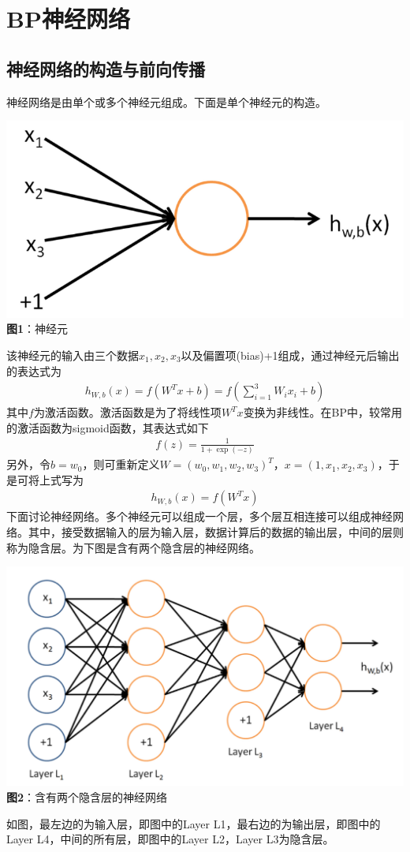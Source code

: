 \section{BP神经网络}
\subsection{神经网络的构造与前向传播}
神经网络是由单个或多个神经元组成。下面是单个神经元的构造。
\begin{center}
\includegraphics[scale=0.5]{../figures/NN1.png}\\
\textbf{图1}：神经元 
\end{center}
该神经元的输入由三个数据$x_1,x_2,x_3$以及偏置项(bias)+1组成，通过神经元后输出的表达式为
\begin{eqnarray}
h_{W,b}(x)=f(W^Tx+b)=f(\sum_{i=1}^3 W_ix_i+b)
\end{eqnarray}
其中$f$为激活函数。激活函数是为了将线性项$W^Tx$变换为非线性。在BP中，较常用的激活函数为sigmoid函数，其表达式如下
\begin{eqnarray}
f(z)=\frac{1}{1+\exp(-z)}
\end{eqnarray}
另外，令$b=w_0$，则可重新定义$W=(w_0,w_1,w_2,w_3)^T$，$x=(1,x_1,x_2,x_3)$，于是可将上式写为
\begin{eqnarray}
h_{W,b}(x)=f(W^Tx)
\end{eqnarray}
下面讨论神经网络。多个神经元可以组成一个层，多个层互相连接可以组成神经网络。其中，接受数据输入的层为输入层，数据计算后的数据的输出层，中间的层则称为隐含层。为下图是含有两个隐含层的神经网络。
\begin{center}
\includegraphics[scale=0.5]{../figures/NN2.png}\\
\textbf{图2}：含有两个隐含层的神经网络
\end{center}
如图，最左边的为输入层，即图中的Layer L1，最右边的为输出层，即图中的Layer L4，中间的所有层，即图中的Layer L2，Layer L3为隐含层。

